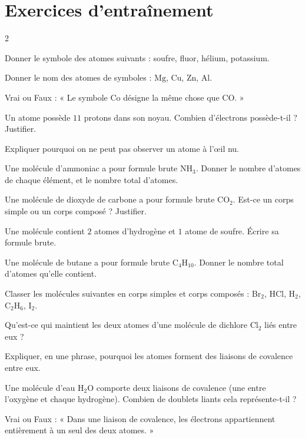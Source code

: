 \section{Exercices d'entraînement}
\begin{multicols}{2}

\exo{} Donner le symbole des atomes suivants : soufre, fluor, hélium, potassium.

\exo{} Donner le nom des atomes de symboles : $\mathrm{Mg}$, $\mathrm{Cu}$,
$\mathrm{Zn}$, $\mathrm{Al}$.

\exo{} Vrai ou Faux : « Le symbole $\mathrm{Co}$ désigne la même chose que
$\mathrm{CO}$. »

\exo{} Un atome possède $11$ protons dans son noyau. Combien d'électrons possède-t-il
? Justifier.

\exo{} Expliquer pourquoi on ne peut pas observer un atome à l'œil nu.

\exo{} Une molécule d'ammoniac a pour formule brute $\mathrm{NH_3}$. Donner le
nombre d'atomes de chaque élément, et le nombre total d'atomes.

\exo{} Une molécule de dioxyde de carbone a pour formule brute $\mathrm{CO_2}$.
Est-ce un corps simple ou un corps composé ? Justifier.

\exo{} Une molécule contient $2$ atomes d'hydrogène et $1$ atome de soufre. Écrire
sa formule brute.

\exo{} Une molécule de butane a pour formule brute $\mathrm{C_4H_{10}}$. Donner le
nombre total d'atomes qu'elle contient.

\exo{} Classer les molécules suivantes en corps simples et corps composés :
$\mathrm{Br_2}$, $\mathrm{HCl}$, $\mathrm{H_2}$, $\mathrm{C_2H_6}$, $\mathrm{I_2}$.

\exo{} Qu'est-ce qui maintient les deux atomes d'une molécule de dichlore
$\mathrm{Cl_2}$ liés entre eux ?

\exo{} Expliquer, en une phrase, pourquoi les atomes forment des liaisons de
covalence entre eux.

\exo{} Une molécule d'eau $\mathrm{H_2O}$ comporte deux liaisons de covalence
(une entre l'oxygène et chaque hydrogène). Combien de doublets liants cela représente-t-il ?

\exo{} Vrai ou Faux : « Dans une liaison de covalence, les électrons appartiennent
entièrement à un seul des deux atomes. »


\end{multicols}
